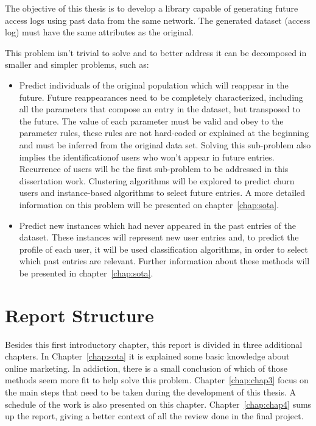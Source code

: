 The objective of this thesis is to develop a library capable of generating future access logs using past data from the same network.
The generated dataset (access log) must have the same attributes as the original.

This problem isn't trivial to solve and to better address it can be decomposed in smaller and simpler problems, such as:
\begin{itemize}
    \item Predict individuals of the original population which will reappear in the future. Future reappearances need to be completely characterized, including 
      all the parameters that compose an entry in the dataset, but transposed to the future. The value of each parameter must be valid and obey to the parameter
      rules, these rules are not hard-coded or explained at the beginning and must be inferred from the original data set. Solving this sub-problem also implies the identificationof users who won't appear in future entries. Recurrence of users will be the first sub-problem to be addressed in this dissertation work. 
      Clustering algorithms will be explored to predict churn users and instance-based algorithms to select future entries. A more detailed information
      on this problem will be presented on chapter~\ref{chap:sota}.
    \item Predict new instances which had never appeared in the past entries of the dataset.
      These instances will represent new user entries and, to predict the profile of each user, it will be used classification algorithms, in order to select 
      which past entries are relevant. Further information about these methods will be presented in
      chapter~\ref{chap:sota}.
\end{itemize}

\section{Report Structure} \label{sec:struct}

Besides this first introductory chapter, this report is divided in three additional chapters.
In Chapter~\ref{chap:sota} it is explained some basic knowledge about online marketing. In addiction, there is
a small conclusion of which of those methods seem more fit to help solve this problem.
Chapter~\ref{chap:chap3} focus on the main steps that need to be taken during the development of this thesis. A schedule of the work is also
presented on this chapter.
Chapter~\ref{chap:chap4} sums up the report, giving a better context of all the review done in the final project.
